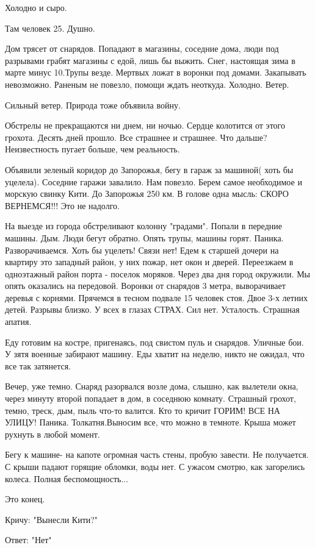 Холодно и сыро.

Там человек 25. Душно.

Дом трясет от снарядов. Попадают в магазины, соседние дома, люди под разрывами
грабят магазины с едой, лишь бы выжить. Снег, настоящая зима в марте минус
10.Трупы везде. Мертвых ложат в воронки под домами. Закапывать невозможно.
Раненым не повезло, помощи ждать неоткуда. Холодно. Ветер.

Сильный ветер. Природа тоже объявила войну.

Обстрелы не прекращаются ни днем, ни ночью. Сердце колотится от этого грохота.
Десять дней прошло. Все страшнее и страшнее. Что дальше? Неизвестность пугает
больше, чем реальность.

Объявили зеленый коридор до Запорожья, бегу в гараж за машиной( хоть бы
уцелела). Соседние гаражи завалило. Нам повезло. Берем самое необходимое и
морскую свинку Кити. До Запорожья 250 км. В голове одна мысль: СКОРО
ВЕРНЕМСЯ!!! Это не надолго.

На выезде из города обстреливают колонну "градами". Попали в передние машины.
Дым. Люди бегут обратно.  Опять трупы, машины горят. Паника. Разворачиваемся.
Хоть бы уцелеть! Связи нет! Едем к старшей дочери на квартиру это западный
район, у них пожар, нет окон и дверей. Переезжаем в одноэтажный район порта -
поселок моряков. Через два дня город окружили. Мы опять оказались на передовой.
Воронки от снарядов 3 метра, выворачивает деревья с корнями. Прячемся в тесном
подвале 15 человек стоя. Двое 3-х летних детей. Разрывы близко. У всех в глазах
СТРАХ.  Сил нет. Усталость. Страшная апатия.

Еду готовим на костре, пригенаясь, под свистом пуль и снарядов. Уличные бои. У
зятя военные забирают машину. Еды хватит на неделю, никто не ожидал, что все
так затянется.

Вечер, уже темно. Снаряд разорвался возле дома, слышно, как вылетели окна,
через минуту второй попадает в дом, в соседнюю комнату. Страшный грохот, темно,
треск, дым, пыль что-то валится. Кто то  кричит ГОРИМ! ВСЕ НА УЛИЦУ! Паника.
Толкатня.Выносим все, что можно в темноте. Крыша может рухнуть в любой момент.

Бегу к машине- на капоте огромная часть стены, пробую завести. Не получается. С
крыши падают горящие обломки, воды нет. С ужасом смотрю, как загорелись колеса.
Полная беспомощность...

Это конец.

Кричу: "Вынесли Кити?"

Ответ: "Нет"

